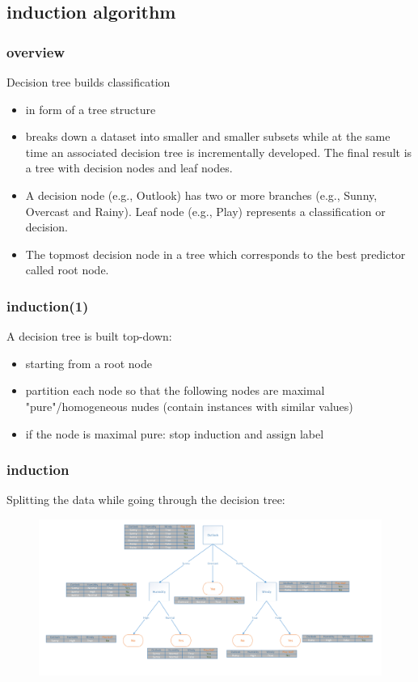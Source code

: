 \documentclass{beamer}
\begin{document}
\subsection{induction algorithm}
\begin{frame}
\frametitle{overview}
Decision tree builds classification 

\begin{itemize}
\item in form of a tree structure
\item breaks down a dataset into smaller and smaller subsets while at the same time an associated decision tree is incrementally developed. The final result is a tree with decision nodes and leaf nodes. 
\item A decision node (e.g., Outlook) has two or more branches (e.g., Sunny, Overcast and Rainy). Leaf node (e.g., Play) represents a classification or decision.
\item The topmost decision node in a tree which corresponds to the best predictor called root node.
\end{itemize}
\end{frame}
\begin{frame}
\frametitle{induction(1)}
A decision tree is built top-down:
\begin{itemize}
\item starting from a root node
\item partition each node so that the following nodes are maximal "pure"/homogeneous nudes (contain instances with similar values)
\item if the node is maximal pure: stop induction and assign label
\end{itemize}
\end{frame}


\begin{frame}
\frametitle{induction}
Splitting the data while going through the decision tree:
\begin{figure}
\includegraphics[width = 1.0\linewidth]{figures/04/01_classification/decision_tree_induction.png}
\end{figure}
\end{frame}
\end{document}
